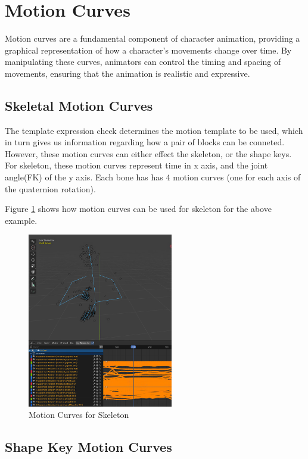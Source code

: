 \documentclass[../../main.tex]{subfiles}
\begin{document}
\section{Motion Curves}
\label{ch:intermediate_blocks:curves}

Motion curves are a fundamental component of character animation, providing a graphical representation of how a character's movements change over time. By manipulating these curves, animators can control the timing and spacing of movements, ensuring that the animation is realistic and expressive.

\subsection{Skeletal Motion Curves}
\label{ch:intermediate_blocks:curves:skeletal}

The template expression check determines the motion template to be used, which in turn gives us information regarding how a pair of blocks can be conneted. However, these motion curves can either effect the skeleton, or the shape keys. For skeleton, these motion curves represent time in x axis, and the joint angle(FK) of the y axis. Each bone has has 4 motion curves (one for each axis of the quaternion rotation).

Figure \ref{fig:motion_curves_skeletal} shows how motion curves can be used for skeleton for the above example.

\begin{figure}
    \centering \includegraphics[width = 2.5in]{chapters/intermediate_blocks/images/motion_curves_skeletal.png}
    \caption{Motion Curves for Skeleton}
    \label{fig:motion_curves_skeletal}
\end{figure}

\subsection{Shape Key Motion Curves}
\label{ch:intermediate_blocks:curves:shape_keys}
\end{document}
